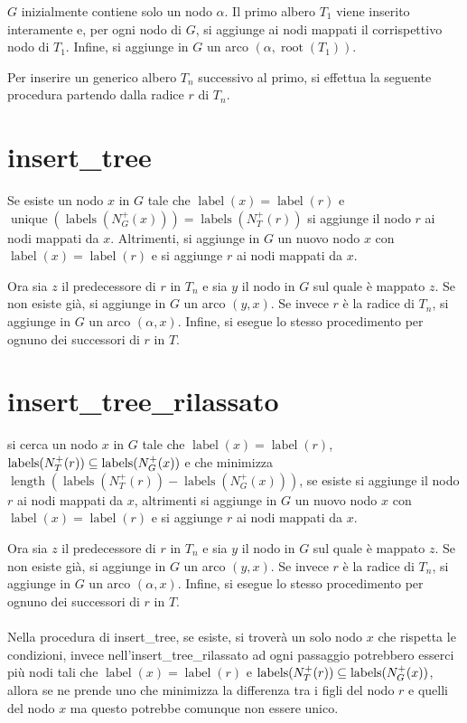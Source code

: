 \documentclass{article}
\begin{document}
$G$ inizialmente contiene solo un nodo $\alpha$.  
Il primo albero $T_1$ viene inserito interamente e, per ogni nodo di $G$,  
si aggiunge ai nodi mappati il corrispettivo nodo di $T_1$.  
Infine, si aggiunge in $G$ un arco $(\alpha, \operatorname{root}(T_1))$.

Per inserire un generico albero $T_n$ successivo al primo,  
si effettua la seguente procedura partendo dalla radice $r$ di $T_n$.

\section*{insert\_tree}
Se esiste un nodo $x$ in $G$ tale che $\operatorname{label}(x) = \operatorname{label}(r) $
e $\operatorname{unique}(\operatorname{labels}(N_G^+(x))) = \operatorname{labels}(N_T^+(r))$ si aggiunge il nodo $r$ ai nodi mappati da $x$. Altrimenti, si aggiunge in $G$ un nuovo nodo $x$ con  
\(\operatorname{label}(x) = \operatorname{label}(r)\)  
e si aggiunge $r$ ai nodi mappati da $x$.

Ora sia $z$ il predecessore di $r$ in $T_n$ e sia $y$ il nodo in $G$ sul quale è mappato $z$.  
Se non esiste già, si aggiunge in $G$ un arco $(y, x)$.  
Se invece $r$ è la radice di $T_n$, si aggiunge in $G$ un arco $(\alpha, x)$.  
Infine, si esegue lo stesso procedimento per ognuno dei successori di $r$ in $T$.

\section*{insert\_tree\_rilassato}
si cerca un nodo $x$ in $G$ tale che $\operatorname{label}(x) = \operatorname{label}(r)$,  $\space \operatorname{labels}(N_T^+(r)) \subseteq \operatorname{labels}(N_G^+(x))$ e  che minimizza $\operatorname{length}(\operatorname{labels}(N_T^+(r)) - \operatorname{labels}(N_G^+(x)))$, se esiste si aggiunge il nodo $r$ ai nodi mappati da $x$, altrimenti si aggiunge in $G$ un nuovo nodo $x$ con $\operatorname{label}(x) = \operatorname{label}(r)$ e si aggiunge $r$ ai nodi mappati da $x$.

Ora sia $z$ il predecessore di $r$ in $T_n$ e sia $y$ il nodo in $G$ sul quale è mappato $z$. Se non esiste già, si aggiunge in $G$ un arco $(y, x)$. Se invece $r$ è la radice di $T_n$, si aggiunge in $G$ un arco $(\alpha, x)$. Infine, si esegue lo stesso procedimento per ognuno dei successori di $r$ in $T$.
\\ \\
Nella procedura di insert\_tree, se esiste, si troverà un solo nodo $x$ che rispetta le condizioni, invece nell'insert\_tree\_rilassato ad ogni passaggio potrebbero esserci più nodi tali che $\operatorname{label}(x) = \operatorname{label}(r)$ e $\space \operatorname{labels}(N_T^+(r)) \subseteq \operatorname{labels}(N_G^+(x))$, allora se ne prende uno che minimizza la differenza tra i figli del nodo $r$ e quelli del nodo $x$ ma questo potrebbe comunque non essere unico.
\clearpage
\end{document}
